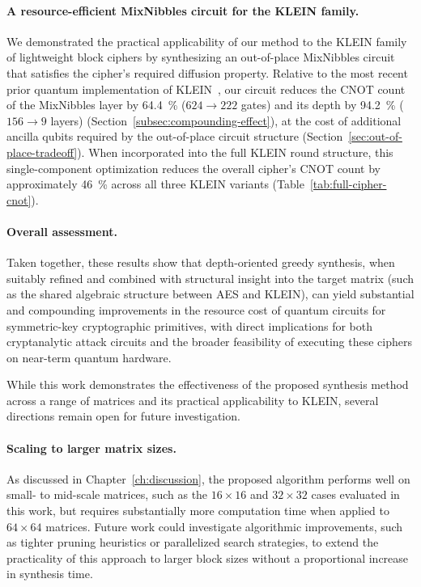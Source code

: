 \paragraph{A resource-efficient MixNibbles circuit for the KLEIN family.}
We demonstrated the practical applicability of our method to the KLEIN family of lightweight block ciphers by synthesizing an out-of-place MixNibbles circuit that satisfies the cipher's required diffusion property. Relative to the most recent prior quantum implementation of KLEIN~\cite{cryptoeprint:2026/1007}, our circuit reduces the CNOT count of the MixNibbles layer by \SI{64.4}{\percent} ($624 \to 222$ gates) and its depth by \SI{94.2}{\percent} ($156 \to 9$ layers) (Section~\ref{subsec:compounding-effect}), at the cost of additional ancilla qubits required by the out-of-place circuit structure (Section~\ref{sec:out-of-place-tradeoff}). When incorporated into the full KLEIN round structure, this single-component optimization reduces the overall cipher's CNOT count by approximately \SI{46}{\percent} across all three KLEIN variants (Table~\ref{tab:full-cipher-cnot}).

\paragraph{Overall assessment.}
Taken together, these results show that depth-oriented greedy synthesis, when suitably refined and combined with structural insight into the target matrix (such as the shared algebraic structure between AES and KLEIN), can yield substantial and compounding improvements in the resource cost of quantum circuits for symmetric-key cryptographic primitives, with direct implications for both cryptanalytic attack circuits and the broader feasibility of executing these ciphers on near-term quantum hardware.

While this work demonstrates the effectiveness of the proposed synthesis method across a range of matrices and its practical applicability to KLEIN, several directions remain open for future investigation.

\paragraph{Scaling to larger matrix sizes.}
As discussed in Chapter~\ref{ch:discussion}, the proposed algorithm performs well on small- to mid-scale matrices, such as the $16 \times 16$ and $32 \times 32$ cases evaluated in this work, but requires substantially more computation time when applied to $64 \times 64$ matrices. Future work could investigate algorithmic improvements, such as tighter pruning heuristics or parallelized search strategies, to extend the practicality of this approach to larger block sizes without a proportional increase in synthesis time.

